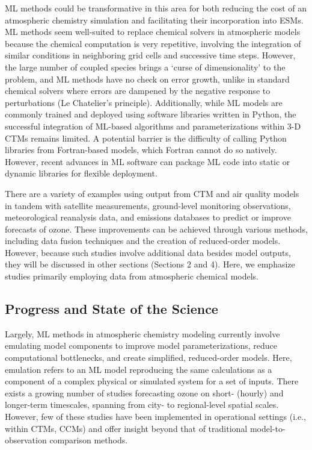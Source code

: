 \documentclass[gmd, manuscript]{copernicus}
\begin{document}
ML methods could be transformative in this area for both reducing the cost of an atmospheric chemistry simulation and facilitating their incorporation into ESMs. ML methods seem well-suited to replace chemical solvers in atmospheric models because the chemical computation is very repetitive, involving the integration of similar conditions in neighboring grid cells and successive time steps. However, the large number of coupled species brings a ‘curse of dimensionality’ to the problem, and ML methods have no check on error growth, unlike in standard chemical solvers where errors are dampened by the negative response to perturbations (Le Chatelier’s principle). Additionally, while ML models are commonly trained and deployed using software libraries written in Python, the successful integration of ML-based algorithms and parameterizations within 3-D CTMs remains limited. A potential barrier is the difficulty of calling Python libraries from Fortran-based models, which Fortran cannot do so natively. However, recent advances in ML software can package ML code into static or dynamic libraries for flexible deployment.
                                                                             
There are a variety of examples using output from CTM and air quality models in tandem with satellite measurements, ground-level monitoring observations, meteorological reanalysis data, and emissions databases to predict or improve forecasts of ozone. These improvements can be achieved through various methods, including data fusion techniques and the creation of reduced-order models. However, because such studies involve additional data besides model outputs, they will be discussed in other sections (Sections 2 and 4). Here, we emphasize studies primarily employing data from atmospheric chemical models.

\subsection{Progress and State of the Science}
Largely, ML methods in atmospheric chemistry modeling currently involve emulating model components to improve model parameterizations, reduce computational bottlenecks, and create simplified, reduced-order models. Here, emulation refers to an ML model reproducing the same calculations as a component of a complex physical or simulated system for a set of inputs. There exists a growing number of studies forecasting ozone on short- (hourly) \citep{yafouz_comprehensive_2022} and longer-term \citep{du_forecasting_2022, Chen2023} timescales, spanning from city- \citep{ojha_exploring_2021} to regional-level \citep{ortiz_combination_2021} spatial scales. However, few of these studies have been implemented in operational settings (i.e., within CTMs, CCMs) and offer insight beyond that of traditional model-to-observation comparison methods.   
\end{document}
